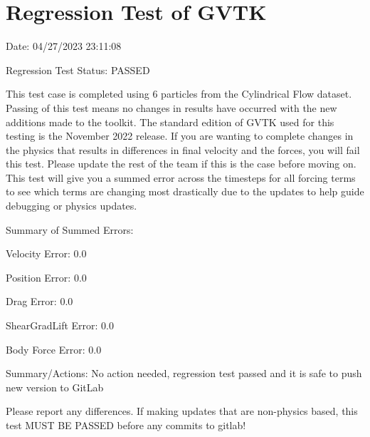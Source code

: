 \documentclass{article}
\begin{document}
\section{Regression Test of GVTK}
Date: 04/27/2023 23:11:08

\vspace{5pt}

\noindent Regression Test Status: PASSED

\vspace{5pt}

\noindent This test case is completed using 6 particles from the Cylindrical Flow dataset. Passing of this test means no changes in results have occurred with the new additions made to the toolkit.
The standard edition of GVTK used for this testing is the November 2022 release. If you are wanting to complete changes in the physics that results in differences in final velocity and the forces,
you will fail this test. Please update the rest of the team if this is the case before moving on. This test will give you a summed error across the timesteps for all forcing terms to see which terms
are changing most drastically due to the updates to help guide debugging or physics updates.



\vspace{5pt}

\noindent Summary of Summed Errors:
\vspace{5pt}

Velocity Error: 0.0

Position Error: 0.0

Drag Error: 0.0

ShearGradLift Error: 0.0

Body Force Error: 0.0

\vspace{5pt}

\noindent Summary/Actions: No action needed, regression test passed and it is safe to push new version to GitLab

\vspace{5pt}

\noindent Please report any differences. If making updates that are non-physics based, this test MUST BE PASSED before any commits to gitlab!
\end{document}

